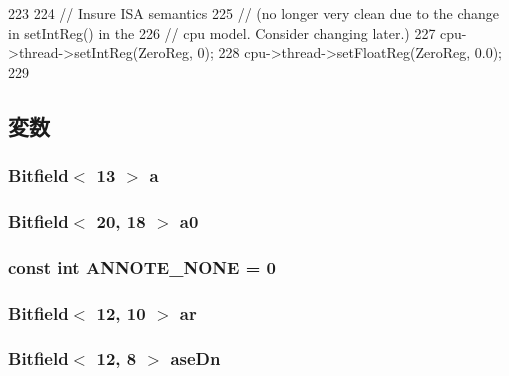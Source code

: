 \begin{DoxyCode}
223 {
224     // Insure ISA semantics
225     // (no longer very clean due to the change in setIntReg() in the
226     // cpu model.  Consider changing later.)
227     cpu->thread->setIntReg(ZeroReg, 0);
228     cpu->thread->setFloatReg(ZeroReg, 0.0);
229 }
\end{DoxyCode}


\subsection{変数}
\hypertarget{namespaceMipsISA_ad15ace88a723e43c4e98c8c646891e79}{
\subsubsection[{a}]{\setlength{\rightskip}{0pt plus 5cm}Bitfield$<$ 13 $>$ {\bf a}}}
\label{namespaceMipsISA_ad15ace88a723e43c4e98c8c646891e79}
\hypertarget{namespaceMipsISA_a12f761936cfc5ebfa95023b681c197ea}{
\subsubsection[{a0}]{\setlength{\rightskip}{0pt plus 5cm}Bitfield$<$ 20, 18 $>$ {\bf a0}}}
\label{namespaceMipsISA_a12f761936cfc5ebfa95023b681c197ea}
\hypertarget{namespaceMipsISA_aba6031cb7b02bf6b349b736f4076d640}{
\subsubsection[{ANNOTE\_\-NONE}]{\setlength{\rightskip}{0pt plus 5cm}const int {\bf ANNOTE\_\-NONE} = 0}}
\label{namespaceMipsISA_aba6031cb7b02bf6b349b736f4076d640}
\hypertarget{namespaceMipsISA_ad63d489b658fc87db3e2184fd0111a37}{
\subsubsection[{ar}]{\setlength{\rightskip}{0pt plus 5cm}Bitfield$<$ 12, 10 $>$ {\bf ar}}}
\label{namespaceMipsISA_ad63d489b658fc87db3e2184fd0111a37}
\hypertarget{namespaceMipsISA_a4c7f9eb0c1fa6cec7058e1a82a1f24c1}{
\subsubsection[{aseDn}]{\setlength{\rightskip}{0pt plus 5cm}Bitfield$<$ 12, 8 $>$ {\bf aseDn}}}
